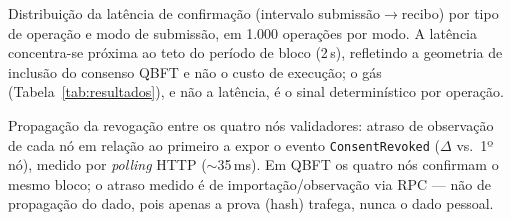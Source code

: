 

\caption{Distribuição da latência de confirmação (intervalo submissão$\rightarrow$recibo)
por tipo de operação e modo de submissão, em 1.000 operações por modo. A latência
concentra-se próxima ao teto do período de bloco (2\,s), refletindo a geometria de
inclusão do consenso QBFT e não o custo de execução; o gás (Tabela~\ref{tab:resultados}),
e não a latência, é o sinal determinístico por operação.}
\label{fig:latencia}

\caption{Propagação da revogação entre os quatro nós validadores: atraso de observação
de cada nó em relação ao primeiro a expor o evento \texttt{ConsentRevoked}
($\Delta$ vs.\ 1º nó), medido por \emph{polling} HTTP ($\sim$35\,ms). Em QBFT os quatro
nós confirmam o mesmo bloco; o atraso medido é de importação/observação via RPC --- não
de propagação do dado, pois apenas a prova (hash) trafega, nunca o dado pessoal.}
\label{fig:propagacao}
